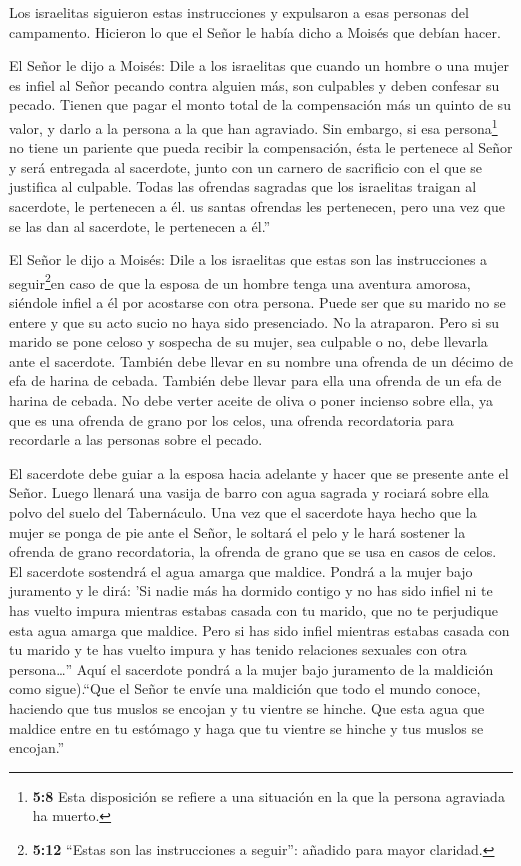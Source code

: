  Los israelitas siguieron estas instrucciones y expulsaron a
esas personas del campamento. Hicieron lo que el Señor le había dicho a
Moisés que debían hacer.

 El Señor le dijo a Moisés:  Dile a los
israelitas que cuando un hombre o una mujer es infiel al Señor pecando
contra alguien más, son culpables  y deben confesar su
pecado. Tienen que pagar el monto total de la compensación más un quinto
de su valor, y darlo a la persona a la que han agraviado. 
Sin embargo, si esa persona\footnote{\textbf{5:8} Esta disposición se
  refiere a una situación en la que la persona agraviada ha muerto.} no
tiene un pariente que pueda recibir la compensación, ésta le pertenece
al Señor y será entregada al sacerdote, junto con un carnero de
sacrificio con el que se justifica al culpable.  Todas las
ofrendas sagradas que los israelitas traigan al sacerdote, le pertenecen
a él.  us santas ofrendas les pertenecen, pero una vez que
se las dan al sacerdote, le pertenecen a él.''

 El Señor le dijo a Moisés:  Dile a los
israelitas que estas son las instrucciones a seguir\footnote{\textbf{5:12}
  ``Estas son las instrucciones a seguir'': añadido para mayor claridad.}en
caso de que la esposa de un hombre tenga una aventura amorosa, siéndole
infiel a él  por acostarse con otra persona. Puede ser que
su marido no se entere y que su acto sucio no haya sido presenciado. No
la atraparon.  Pero si su marido se pone celoso y sospecha
de su mujer, sea culpable o no,  debe llevarla ante el
sacerdote. También debe llevar en su nombre una ofrenda de un décimo de
efa de harina de cebada. También debe llevar para ella una ofrenda de un
efa de harina de cebada. No debe verter aceite de oliva o poner incienso
sobre ella, ya que es una ofrenda de grano por los celos, una ofrenda
recordatoria para recordarle a las personas sobre el pecado.

 El sacerdote debe guiar a la esposa hacia adelante y hacer
que se presente ante el Señor.  Luego llenará una vasija de
barro con agua sagrada y rociará sobre ella polvo del suelo del
Tabernáculo.  Una vez que el sacerdote haya hecho que la
mujer se ponga de pie ante el Señor, le soltará el pelo y le hará
sostener la ofrenda de grano recordatoria, la ofrenda de grano que se
usa en casos de celos. El sacerdote sostendrá el agua amarga que
maldice.  Pondrá a la mujer bajo juramento y le dirá: 'Si
nadie más ha dormido contigo y no has sido infiel ni te has vuelto
impura mientras estabas casada con tu marido, que no te perjudique esta
agua amarga que maldice.  Pero si has sido infiel mientras
estabas casada con tu marido y te has vuelto impura y has tenido
relaciones sexuales con otra persona\ldots''  Aquí el
sacerdote pondrá a la mujer bajo juramento de la maldición como
sigue).``Que el Señor te envíe una maldición que todo el mundo conoce,
haciendo que tus muslos se encojan y tu vientre se hinche. 
Que esta agua que maldice entre en tu estómago y haga que tu vientre se
hinche y tus muslos se encojan.''

